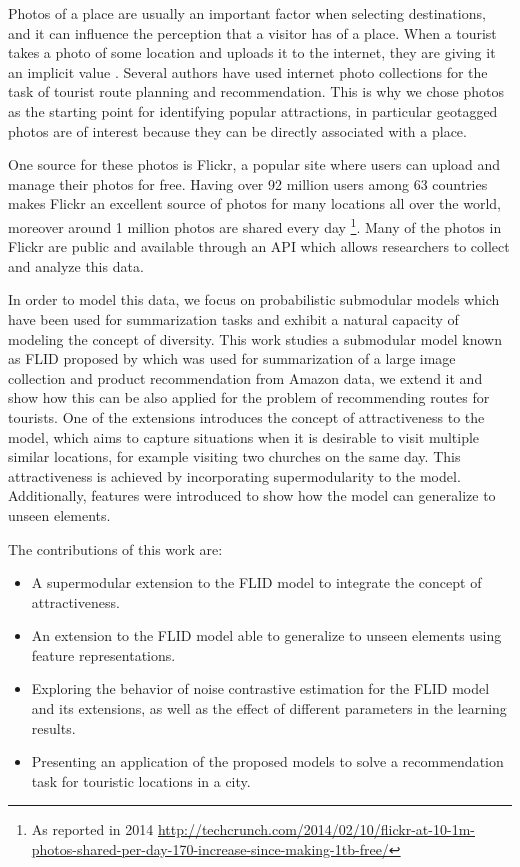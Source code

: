 Photos of a place are usually an important factor when selecting destinations, and it can influence the perception that a visitor has of a place. When a tourist takes a photo of some location and uploads it to the internet, they are giving it an implicit value  \citep{Donaire2014}. Several authors have used internet photo collections for the task of tourist route planning and recommendation. This is why we chose photos as the starting point for identifying popular attractions, in particular geotagged photos are of interest because they can be directly associated with a place.

One source for these photos is Flickr, a popular site where users can upload and manage their photos for free. Having over 92 million users among 63 countries makes Flickr an excellent source of photos for many locations all over the world, moreover around 1 million photos are shared every day \footnote{As reported in 2014 \url{http://techcrunch.com/2014/02/10/flickr-at-10-1m-photos-shared-per-day-170-increase-since-making-1tb-free/}}. Many of the photos in Flickr are public and available through an API which allows researchers to collect and analyze this data.

In order to model this data, we focus on probabilistic submodular models which have been used for summarization tasks and exhibit a natural capacity of modeling the concept of diversity. This work studies a submodular model known as FLID proposed by \citet{tschiatschek16learning} which was used for summarization of a large image collection and product recommendation from Amazon data, we extend it and show how this can be also applied for the problem of recommending routes for tourists. One of the extensions introduces the concept of attractiveness to the model, which aims to capture situations when it is desirable to visit multiple similar locations, for example visiting two churches on the same day. This attractiveness is achieved by incorporating supermodularity to the model. Additionally, features were introduced to show how the model can generalize to unseen elements.

The contributions of this work are:

\begin{itemize}
  \item A supermodular extension to the FLID model to integrate the concept of attractiveness.
  \item An extension to the FLID model able to generalize to unseen elements using feature representations.
  \item Exploring the behavior of noise contrastive estimation for the FLID model and its extensions, as well as the effect of different parameters in the learning results.
  \item Presenting an application of the proposed models to solve a recommendation task for touristic locations in a city.
\end{itemize}

